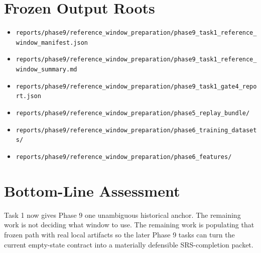 \documentclass{article}
\begin{document}
\section*{Frozen Output Roots}
\begin{itemize}
\item \texttt{reports/phase9/reference\_window\_preparation/phase9\_task1\_reference\_window\_manifest.json}
\item \texttt{reports/phase9/reference\_window\_preparation/phase9\_task1\_reference\_window\_summary.md}
\item \texttt{reports/phase9/reference\_window\_preparation/phase9\_task1\_gate4\_report.json}
\item \texttt{reports/phase9/reference\_window\_preparation/phase5\_replay\_bundle/}
\item \texttt{reports/phase9/reference\_window\_preparation/phase6\_training\_datasets/}
\item \texttt{reports/phase9/reference\_window\_preparation/phase6\_features/}
\end{itemize}

\section*{Bottom-Line Assessment}
Task 1 now gives Phase 9 one unambiguous historical anchor. The remaining work is not deciding what window to use. The remaining work is populating that frozen path with real local artifacts so the later Phase 9 tasks can turn the current empty-state contract into a materially defensible SRS-completion packet.
\end{document}
